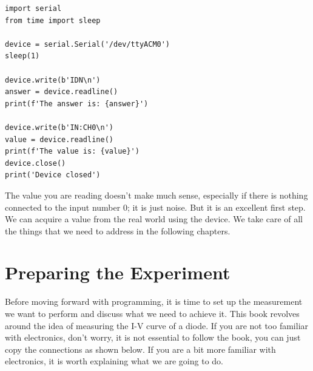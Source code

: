 \begin{verbatim}
import serial
from time import sleep

device = serial.Serial('/dev/ttyACM0')
sleep(1)

device.write(b'IDN\n')
answer = device.readline()
print(f'The answer is: {answer}')

device.write(b'IN:CH0\n')
value = device.readline()
print(f'The value is: {value}')
device.close()
print('Device closed')
\end{verbatim}

The value you are reading doesn't make much sense, especially if there is nothing connected to the input number 0; it is just noise. But it is an excellent first step. We can acquire a value from the real world using the device. We take care of all the things that we need to address in the following chapters.








\section{Preparing the Experiment}\label{sec:preparing-the-experiment}
Before moving forward with programming, it is time to set up the measurement we want to perform and discuss what we need to achieve it. This book revolves around the idea of measuring the I-V curve of a diode. If you are not too familiar with electronics, don't worry, it is not essential to follow the book, you can just copy the connections as shown below. If you are a bit more familiar with electronics, it is worth explaining what we are going to do.

